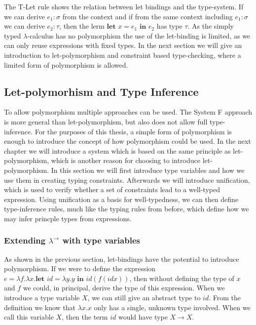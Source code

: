 The T-Let rule shows the relation between let bindings and the type-system.
If we can derive $e_1 : \sigma$ from the context and if from the same context including $e_1 : \sigma$ we can derive $e_2 : \tau$, then the lerm $\textbf{let } x = e_1 \textbf{ in } e_2$ has type $\tau$.
As the simply typed $\lambda$-calculus has no polymorphism the use of the let-binding is limited, as we can only reuse expressions with fixed types.
In the next section we will give an introduction to let-polymorphism and constraint based type-checking, where a limited form of polymorphism is allowed.

\subsection{Let-polymorhism and Type Inference}
To allow polymorphism multiple approaches can be used.
The System F approach is more general than let-polymorphism, but also does not allow full type-inference.
For the purposes of this thesis, a simple form of polymorphism is enough to introduce the concept of how polymorphism could be used.
In the next chapter we will introduce a system which is based on the same principle as let-polymorphism, which is another reason for choosing to introduce let-polymorphism.
In this section we will first introduce type variables and how we use them in creating typing constraints.
Afterwards we will introduce unification, which is used to verify whether a set of constraints lead to a well-typed expression.
Using unification as a basis for well-typedness, we can then define type-inference rules, much like the typing rules from before, which define how we may infer princple types from expressions.

\subsubsection{Extending $\lambda^\rightarrow$ with type variables}
As shown in the previous section, let-bindings have the potential to introduce polymorphism.
If we were to define the expression $e = \lambda f.\lambda x. \textbf{let } id = \lambda y.y \textbf{ in } id (f (id x))$, then without defining the type of $x$ and $f$ we could, in principal, derive the type of this expression.
When we introduce a type variable $X$, we can still give an abstract type to $id$. From the definition we know that $\lambda x.x$ only has a single, unknown type involved.
When we call this variable $X$, then the term $id$ would have type $X \rightarrow X$.

